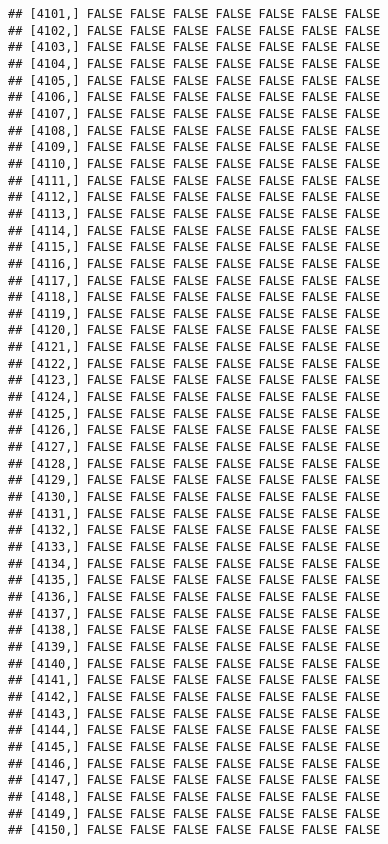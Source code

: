 \documentclass[
]{article}
\begin{document}
\begin{verbatim}
## [4101,] FALSE FALSE FALSE FALSE FALSE FALSE FALSE
## [4102,] FALSE FALSE FALSE FALSE FALSE FALSE FALSE
## [4103,] FALSE FALSE FALSE FALSE FALSE FALSE FALSE
## [4104,] FALSE FALSE FALSE FALSE FALSE FALSE FALSE
## [4105,] FALSE FALSE FALSE FALSE FALSE FALSE FALSE
## [4106,] FALSE FALSE FALSE FALSE FALSE FALSE FALSE
## [4107,] FALSE FALSE FALSE FALSE FALSE FALSE FALSE
## [4108,] FALSE FALSE FALSE FALSE FALSE FALSE FALSE
## [4109,] FALSE FALSE FALSE FALSE FALSE FALSE FALSE
## [4110,] FALSE FALSE FALSE FALSE FALSE FALSE FALSE
## [4111,] FALSE FALSE FALSE FALSE FALSE FALSE FALSE
## [4112,] FALSE FALSE FALSE FALSE FALSE FALSE FALSE
## [4113,] FALSE FALSE FALSE FALSE FALSE FALSE FALSE
## [4114,] FALSE FALSE FALSE FALSE FALSE FALSE FALSE
## [4115,] FALSE FALSE FALSE FALSE FALSE FALSE FALSE
## [4116,] FALSE FALSE FALSE FALSE FALSE FALSE FALSE
## [4117,] FALSE FALSE FALSE FALSE FALSE FALSE FALSE
## [4118,] FALSE FALSE FALSE FALSE FALSE FALSE FALSE
## [4119,] FALSE FALSE FALSE FALSE FALSE FALSE FALSE
## [4120,] FALSE FALSE FALSE FALSE FALSE FALSE FALSE
## [4121,] FALSE FALSE FALSE FALSE FALSE FALSE FALSE
## [4122,] FALSE FALSE FALSE FALSE FALSE FALSE FALSE
## [4123,] FALSE FALSE FALSE FALSE FALSE FALSE FALSE
## [4124,] FALSE FALSE FALSE FALSE FALSE FALSE FALSE
## [4125,] FALSE FALSE FALSE FALSE FALSE FALSE FALSE
## [4126,] FALSE FALSE FALSE FALSE FALSE FALSE FALSE
## [4127,] FALSE FALSE FALSE FALSE FALSE FALSE FALSE
## [4128,] FALSE FALSE FALSE FALSE FALSE FALSE FALSE
## [4129,] FALSE FALSE FALSE FALSE FALSE FALSE FALSE
## [4130,] FALSE FALSE FALSE FALSE FALSE FALSE FALSE
## [4131,] FALSE FALSE FALSE FALSE FALSE FALSE FALSE
## [4132,] FALSE FALSE FALSE FALSE FALSE FALSE FALSE
## [4133,] FALSE FALSE FALSE FALSE FALSE FALSE FALSE
## [4134,] FALSE FALSE FALSE FALSE FALSE FALSE FALSE
## [4135,] FALSE FALSE FALSE FALSE FALSE FALSE FALSE
## [4136,] FALSE FALSE FALSE FALSE FALSE FALSE FALSE
## [4137,] FALSE FALSE FALSE FALSE FALSE FALSE FALSE
## [4138,] FALSE FALSE FALSE FALSE FALSE FALSE FALSE
## [4139,] FALSE FALSE FALSE FALSE FALSE FALSE FALSE
## [4140,] FALSE FALSE FALSE FALSE FALSE FALSE FALSE
## [4141,] FALSE FALSE FALSE FALSE FALSE FALSE FALSE
## [4142,] FALSE FALSE FALSE FALSE FALSE FALSE FALSE
## [4143,] FALSE FALSE FALSE FALSE FALSE FALSE FALSE
## [4144,] FALSE FALSE FALSE FALSE FALSE FALSE FALSE
## [4145,] FALSE FALSE FALSE FALSE FALSE FALSE FALSE
## [4146,] FALSE FALSE FALSE FALSE FALSE FALSE FALSE
## [4147,] FALSE FALSE FALSE FALSE FALSE FALSE FALSE
## [4148,] FALSE FALSE FALSE FALSE FALSE FALSE FALSE
## [4149,] FALSE FALSE FALSE FALSE FALSE FALSE FALSE
## [4150,] FALSE FALSE FALSE FALSE FALSE FALSE FALSE

\end{verbatim}
\end{document}
